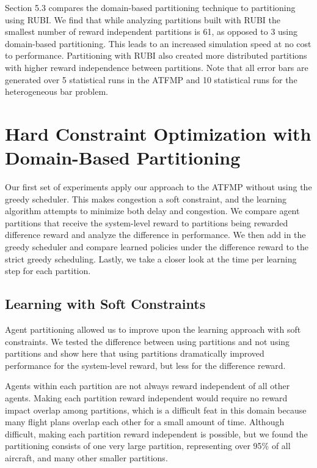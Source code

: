 \documentclass[onehalf,11pt]{beavtex}
\begin{document}
Section 5.3 compares the domain-based partitioning technique to partitioning using RUBI. We find that while analyzing partitions built with RUBI the smallest number of reward independent partitions is 61, as opposed to 3 using domain-based partitioning. This leads to an increased simulation speed at no cost to performance. Partitioning with RUBI also created more distributed partitions with higher reward independence between partitions. Note that all error bars are generated over 5 statistical runs in the ATFMP and 10 statistical runs for the heterogeneous bar problem.

\section{Hard Constraint Optimization with Domain-Based Partitioning}

Our first set of experiments apply our approach to the ATFMP without using the greedy scheduler. This makes congestion a soft constraint, and the learning algorithm attempts to minimize both delay and congestion. We compare agent partitions that receive the system-level reward to partitions being rewarded difference reward and analyze the difference in performance. We then add in the greedy scheduler and compare learned policies under the difference reward to the strict greedy scheduling. Lastly, we take a closer look at the time per learning step for each partition. 

\subsection{Learning with Soft Constraints}
Agent partitioning allowed us to improve upon the learning approach with soft constraints. We tested the difference between using partitions and not using partitions and show here that using partitions dramatically improved performance for the system-level reward, but less for the difference reward.

Agents within each partition are not always reward independent of all other agents. Making each partition reward independent would require no reward impact overlap among partitions, which is a difficult feat in this domain because many flight plans overlap each other for a small amount of time. Although difficult, making each partition reward independent is possible, but we found the partitioning consists of one very large partition, representing over 95\% of all aircraft, and many other smaller partitions. 
\end{document}
